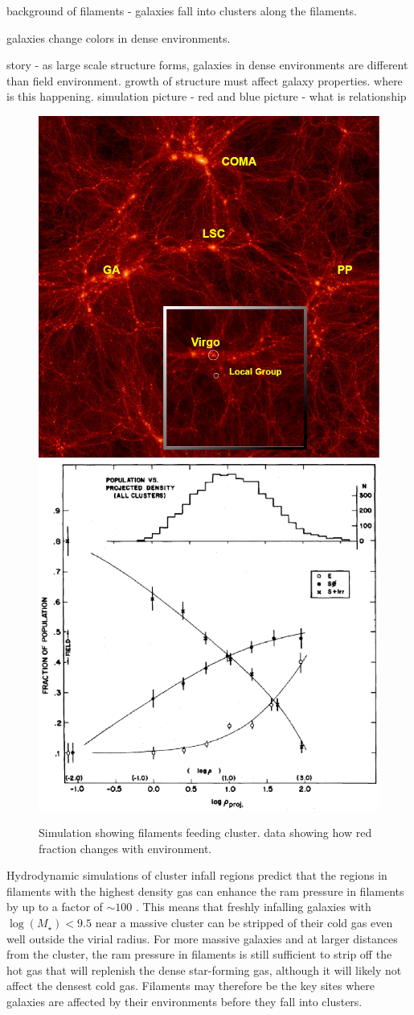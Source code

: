 \documentclass[12pt, preprint]{aastex}
\begin{document}
background of filaments - galaxies fall into clusters along the
filaments.

galaxies change colors in dense environments.

story - as large scale structure forms,
galaxies in dense environments are different than field environment.
growth of structure must affect galaxy properties.  where is this happening.
simulation picture - red and blue picture - what is relationship 

 \begin{figure}[h]
   \centering
 \includegraphics[width=.48\textwidth]{CLUES-DM.png}
 \includegraphics[width=.48\textwidth]{Dressler-morph-dens.png}
   \caption{\small  Simulation showing filaments feeding cluster. data showing how red fraction changes with environment.}
     \label{fig1}
 \end{figure}



Hydrodynamic simulations of cluster infall regions predict that
the regions in filaments with the highest density gas can enhance the ram pressure in
filaments by up to a factor of $\sim 100$ \citep{bahe13}.  This 
means that freshly infalling galaxies with $\log(M_\star)<9.5$ near a massive
cluster can be stripped of their cold gas even well outside the virial
radius.  For more massive galaxies and at larger distances from the
cluster, the ram pressure in filaments is still sufficient to strip
off the hot gas that will replenish the dense star-forming gas,
although it will likely not affect the densest cold gas.  
Filaments may therefore be the key
sites where galaxies are affected by their environments before they fall into
clusters. 
\end{document}
